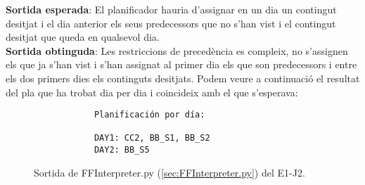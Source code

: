 \documentclass[a4paper]{article}
\begin{document}
	\noindent \textbf{Sortida esperada}: El planificador hauria d'assignar en un dia un contingut desitjat i el dia anterior els seus predecessors que no s'han vist i el contingut desitjat que queda en qualsevol dia. \\
	
	\noindent \textbf{Sortida obtinguda}: Les restriccions de 
	precedència es compleix, no s'assignen els que ja s'han vist i s'han assignat al primer dia els que son predecessors i entre els dos primers dies els continguts desitjats. Podem veure a continuació el resultat del pla que ha trobat dia per dia i coincideix amb el que s'esperava:
	
	\begin{figure}[H]
		\centering
		\begin{verbatim}
			Planificación por día:
			
			DAY1: CC2, BB_S1, BB_S2
			DAY2: BB_S5
		\end{verbatim}
		\caption{Sortida de FFInterpreter.py (\ref{sec:FFInterpreter.py}) del E1-J2.}
	\end{figure}	
	
\end{document}
